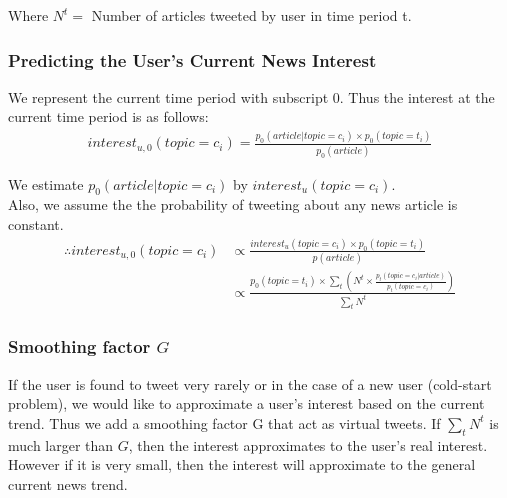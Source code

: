 \documentclass{article}
\begin{document}
Where $N^t =$ Number of articles tweeted by user in time period t. \\

\subsubsection{Predicting the User’s Current News Interest}

We represent the current time period with subscript $0$. Thus the interest at the current time period is as follows: \\

\begin{equation}
\begin{aligned}
interest_{u,0}(topic = c_i) = \displaystyle\frac{p_0(article | topic = c_i) \times p_0(topic = t_i) }{p_0(article)}
\end{aligned}  
\end{equation}

We estimate $p_0(article | topic = c_i)$ by $interest_u(topic = c_i)$. \\ Also, we assume the the probability of tweeting about any news article is constant. \\

\begin{equation}
\begin{aligned}
\therefore interest_{u,0}(topic = c_i) 
& \propto \displaystyle \frac{interest_u(topic = c_i) \times p_0(topic = t_i)}{p(article)} \\
& \propto \displaystyle\frac{p_0(topic = t_i) \times \sum_{t} \left(N^t \times \displaystyle\frac{p_t(topic = c_i| article)}{p_t(topic = c_i)} \right)}{\sum_{t} N^t}
\end{aligned}
\end{equation}

\subsubsection{Smoothing factor $G$}

If the user is found to tweet very rarely or in the case of a new user (cold-start problem), we would like to approximate a user’s interest based on the current trend. Thus we add a smoothing factor G that act as virtual tweets. If $\sum_{t} N^t$ is much larger than $G$, then the interest approximates to the user’s real interest. However if it is very small, then the interest will approximate to the general current news trend. \\
\end{document}
